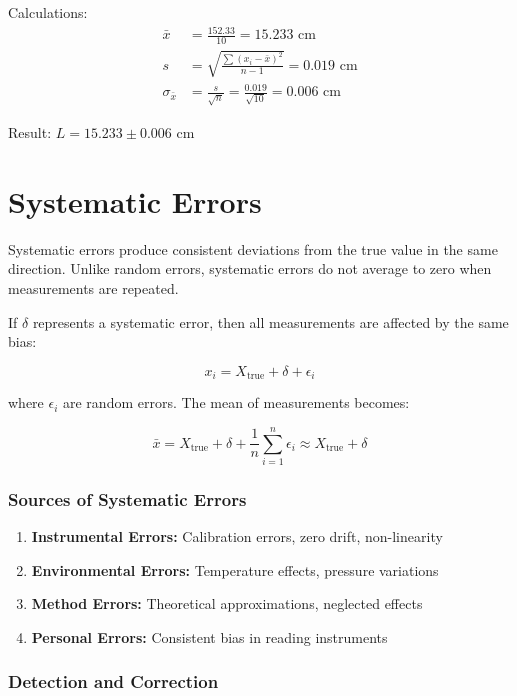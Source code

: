 \documentclass[twoside]{book}
\begin{document}
Calculations:
\begin{align}
\bar{x} &= \frac{152.33}{10} = 15.233 \text{ cm} \\
s &= \sqrt{\frac{\sum(x_i - \bar{x})^2}{n-1}} = 0.019 \text{ cm} \\
\sigma_{\bar{x}} &= \frac{s}{\sqrt{n}} = \frac{0.019}{\sqrt{10}} = 0.006 \text{ cm}
\end{align}

Result: $L = 15.233 \pm 0.006$ cm

\section{Systematic Errors}

Systematic errors produce consistent deviations from the true value in the same direction. Unlike random errors, systematic errors do not average to zero when measurements are repeated.

If $\delta$ represents a systematic error, then all measurements are affected by the same bias:

\begin{equation*}
x_i = X_{\text{true}} + \delta + \epsilon_i
\end{equation*}

where $\epsilon_i$ are random errors. The mean of measurements becomes:

\begin{equation*}
\bar{x} = X_{\text{true}} + \delta + \frac{1}{n}\sum_{i=1}^{n}\epsilon_i \approx X_{\text{true}} + \delta
\end{equation*}

\subsubsection{Sources of Systematic Errors}

\begin{enumerate}
\item \textbf{Instrumental Errors:} Calibration errors, zero drift, non-linearity
\item \textbf{Environmental Errors:} Temperature effects, pressure variations
\item \textbf{Method Errors:} Theoretical approximations, neglected effects
\item \textbf{Personal Errors:} Consistent bias in reading instruments
\end{enumerate}

\subsubsection{Detection and Correction}
\end{document}
